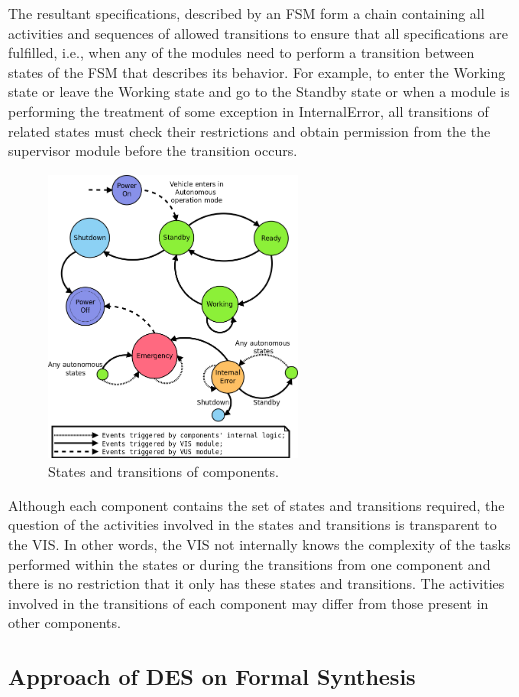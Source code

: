 \documentclass[conference]{IEEEtran}
\begin{document}
The resultant specifications, described by an FSM form a chain containing all activities and sequences of allowed transitions to ensure that all specifications are fulfilled, i.e., when any of the modules need to perform a transition between states of the FSM that describes its behavior. For example, to enter the Working state or leave the Working state and go to the Standby state or when a module is performing the treatment of some exception in InternalError, all transitions of related states must check their restrictions and obtain permission from the the supervisor module before the transition occurs.

\begin{figure}[h]
	\centering
	\includegraphics[width=250px,keepaspectratio]{imagens/VILMA_STATE_MACHINE2}
	\caption{States and transitions of components.}
	\label{fig:VILMA_STATE_MACHINE2}
\end{figure}

Although each component contains the set of states and transitions required, the question of the activities involved in the states and transitions is transparent to the VIS. In other words, the VIS not internally knows the complexity of the tasks performed within the states or during the transitions from one component and there is no restriction that it only has these states and transitions. The activities involved in the transitions of each component may differ from those present in other components.
%
\subsection{Approach of DES on Formal Synthesis }\label{subsec:formal_synthesis}
\end{document}
